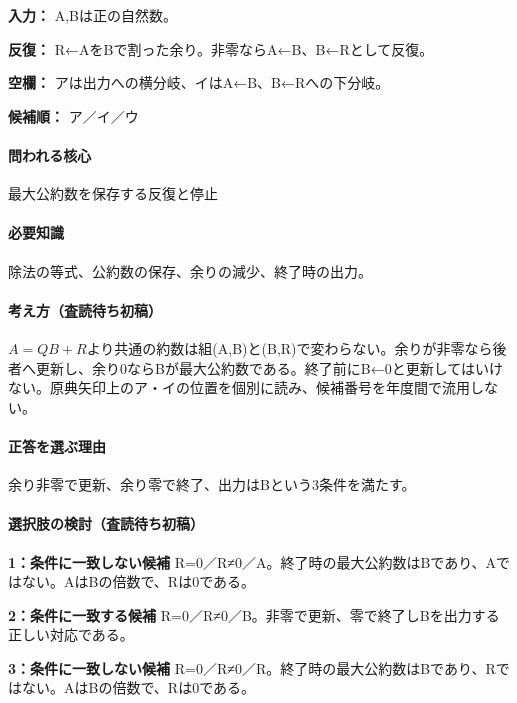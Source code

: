 \noindent\textbf{入力：} A,Bは正の自然数。\par

\noindent\textbf{反復：} R←AをBで割った余り。非零ならA←B、B←Rとして反復。\par

\noindent\textbf{空欄：} アは出力への横分岐、イはA←B、B←Rへの下分岐。\par

\noindent\textbf{候補順：} ア／イ／ウ\par

\paragraph{問われる核心} 最大公約数を保存する反復と停止

\paragraph{必要知識} 除法の等式、公約数の保存、余りの減少、終了時の出力。

\paragraph{考え方（査読待ち初稿）} \(A=QB+R\)より共通の約数は組(A,B)と(B,R)で変わらない。余りが非零なら後者へ更新し、余り0ならBが最大公約数である。終了前にB←0と更新してはいけない。原典矢印上のア・イの位置を個別に読み、候補番号を年度間で流用しない。

\paragraph{正答を選ぶ理由} 余り非零で更新、余り零で終了、出力はBという3条件を満たす。

\paragraph{選択肢の検討（査読待ち初稿）}\mbox{}\par

\noindent\textbf{1：条件に一致しない候補} R=\allowbreak{}0／R≠0／A。終了時の最大公約数はBであり、Aではない。AはBの倍数で、Rは0である。\par

\noindent\textbf{2：条件に一致する候補} R=\allowbreak{}0／R≠0／B。非零で更新、零で終了しBを出力する正しい対応である。\par

\noindent\textbf{3：条件に一致しない候補} R=\allowbreak{}0／R≠0／R。終了時の最大公約数はBであり、Rではない。AはBの倍数で、Rは0である。\par

